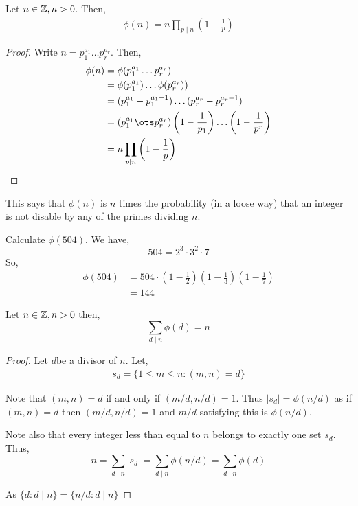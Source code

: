 \begin{theorem}
	Let $n \in \mathbb{Z}, n > 0$. Then, 
	\begin{align*}
		\phi(n) = n \prod_{p \mid n} \left (  1 - \frac{1}{p} \right )
	\end{align*}

\end{theorem}
\begin{proof}
	Write $n = p_{1}^{a_{1}} \dots p_r^{a_r}$. Then, 
	\begin{align*}
		\phi(n) &= \phi(p_{1}^{a_{1}} \dots p_r^{a_r})\\
			&= \phi(p_{1}^{a_{1}}) \dots  \phi(p_r^{a_r}))\\
			&= (p_1^{a_1} - p_{1}^{a_{1} - 1}) \dots (p_r^{a_r} - p_r^{a_r - 1})\\
			&= (p_{1}^{a_{1}} \ots p_r^{a_r}) \left ( 1 - \frac{1}{p_{1}} \right ) \dots \left ( 1 - \frac{1}{p^{r}} \right )\\
			&= n \prod_{p \mid n} \left ( 1 - \frac{1}{p} \right )
	\end{align*}
\end{proof}

\begin{remark}
	This says that $\phi(n)$ is $n$ times the probability (in a loose way) that an integer is not disable by any of the primes dividing $n$.
\end{remark}

\begin{eg}
	Calculate $\phi(504)$. We have, $$
		504 = 2^{3} \cdot 3^2 \cdot 7
	$$
	So,
	\begin{align*}
		\phi(504) &= 504 \cdot (1 - \frac{1}{2}) (1 - \frac{1}{3}) (1 - \frac{1}{7})\\
			  &= 144
	\end{align*} 
\end{eg}

\begin{theorem}
	Let $n \in \mathbb{Z}, n > 0$ then, $$
	\sum_{d \mid n} \phi(d) = n
	$$
\end{theorem}
\begin{proof}
	Let $d $be a divisor of $n$. Let, 
	\begin{align*}
		s_d = \{1 \le m \le n : (m,n) = d\}
	\end{align*}

	Note that $(m,n) = d$ if and only if $\left ( m / d, n / d \right ) = 1$. Thus $| s_d| = \phi( n / d)$ as if $(m,n) = d$ then $(m / d, n / d) = 1$ and $m  / d$ satisfying this is $\phi(n  / d)$.

	\vspace{1em}
	
	Note also that every integer less than equal to $n$ belongs to exactly one set $s_d$. Thus, $$
	n = \sum_{d \mid n} | s_d | = \sum_{d \mid n} \phi(n / d) = \sum_{d \mid n} \phi(d)
	$$

	As $\{d : d \mid n\} = \{n / d : d \mid n\}$
\end{proof}
